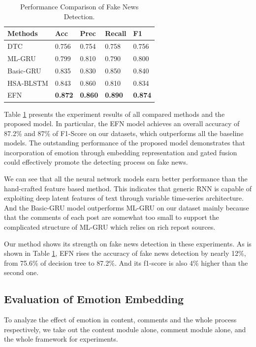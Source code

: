 \documentclass{article}
\newcommand{\m}{EFN}
\begin{document}
	\begin{table}
		\centering
		\begin{tabular}{l||l|l|l|l}
			\toprule
			Methods & Acc & Prec & Recall & F1 \\
			\hline
			\cmidrule{1-5}
			DTC & 0.756    & 0.754  & 0.758 & 0.756 \\
			\cmidrule{1-5}
			ML-GRU & 0.799  & 0.810 & 0.790 &0.800 \\
			\cmidrule{1-5}
			Basic-GRU & 0.835 & 0.830 & 0.850 & 0.840\\
			\cmidrule{1-5}
			HSA-BLSTM & 0.843 & 0.860 & 0.810 & 0.834\\
			\cmidrule{1-5}
			{\m} & {\bf 0.872} & {\bf 0.860} & {\bf 0.890} & {\bf 0.874}\\
			\bottomrule
		\end{tabular}
		\caption{Performance Comparison of Fake News Detection.}
		\label{tab:performanceofbaselines}
		\vspace{-0.3cm}
	\end{table}
	
	Table \ref{tab:performanceofbaselines} presents the experiment results of all compared methods and the proposed model. In particular, the {\m} model achieves an overall accuracy of 87.2\% and 87\% of F1-Score on our datasets, which outperforms all the baseline models. The outstanding performance of the proposed model demonstrates that incorporation of emotion through embedding representation and gated fusion could effectively promote the detecting process on fake news.
	
	We can see that all the neural network models earn better performance than the hand-crafted feature based method. This indicates that generic RNN is capable of exploiting deep latent features of text through variable time-series architecture. And the Basic-GRU model outperforms ML-GRU  on our dataset mainly because that the comments of each post are somewhat too small to support the complicated structure of ML-GRU which relies on rich repost sources. 
	
	Our method shows its strength on fake news detection in these experiments. As is shown in Table \ref{tab:performanceofbaselines}, {\m} rises the accuracy of fake news detection by nearly 12\%, from 75.6\% of decision tree to 87.2\%. And its f1-score is also 4\% higher than the second one.
	
	\subsection{Evaluation of Emotion Embedding}
	To analyze the effect of emotion in content, comments and the whole process respectively, we take out the content module alone, comment module alone, and the whole framework for experiments.
	
\end{document}
